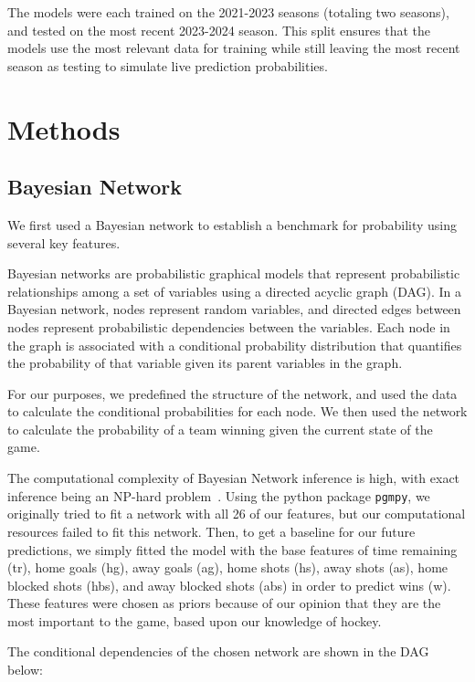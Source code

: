 \documentclass[11pt]{article}
\begin{document}
The models were each trained on the 2021-2023 seasons (totaling two seasons), and tested on the most recent 2023-2024 season. This split ensures that the models use the most relevant data for training while still leaving the most recent season as testing to simulate live prediction probabilities.

\section{Methods}

\subsection{Bayesian Network}
We first used a Bayesian network to establish a benchmark for probability using several key features.

Bayesian networks are probabilistic graphical models that represent probabilistic relationships among a set of variables using a directed acyclic graph (DAG). 
In a Bayesian network, nodes represent random variables, and directed edges between nodes represent probabilistic dependencies between the variables. Each node in the graph is associated with a conditional probability distribution that quantifies the probability of that variable given its parent variables in the graph.

For our purposes, we predefined the structure of the network, and used the data to calculate the conditional probabilities for each node. We then used the network to calculate the probability of a team winning given the current state of the game.

The computational complexity of Bayesian Network inference is high, with exact inference being an NP-hard problem~\cite{pmlr-vR0-chickering95a}. 
Using the python package {\tt pgmpy}, we originally tried to fit a network with all 26 of our features, but our computational resources failed to fit this network.
Then, to get a baseline for our future predictions, we simply fitted the model with the base features of time remaining (tr), home goals (hg), away goals (ag), home shots (hs), away shots (as), home blocked shots (hbs), and away blocked shots (abs) in order to predict wins (w). 
These features were chosen as priors because of our opinion that they are the most important to the game, based upon our knowledge of hockey.

The conditional dependencies of the chosen network are shown in the DAG below:
\end{document}
